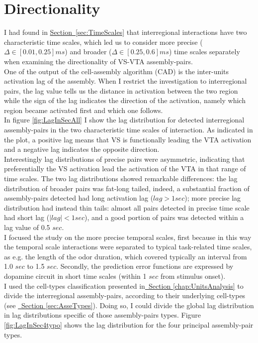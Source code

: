 \section{Directionality} 
\label{sec:Directionality}
 I had found in \hyperref[sec:TimeScales]{Section~\ref*{sec:TimeScales}} that interregional interactions have two characteristic time scales, which led us to consider more precise ($\Delta \in [0.01,0.25] ms$) and broader ($\Delta \in [0.25,0.6] ms$) time scales separately when examining the directionality of VS-VTA assembly-pairs.\\One of the output of the cell-assembly algorithm (CAD) is the inter-units activation lag of the assembly. When I restrict the investigation to interregional pairs, the lag value tells us the distance in activation between the two region while the sign of the lag indicates the direction of the activation, namely which region became activated first and which one follows.\\In figure \ref{fig:LagInSecAll} I show the lag distribution for detected interregional assembly-pairs in the two characteristic time scales of interaction. As indicated in the plot, a positive lag means that VS is functionally leading the VTA activation and a negative lag indicates the opposite direction.\\Interestingly lag distributions of precise pairs were asymmetric, indicating that preferentially the VS activation lead the activation of the VTA in that range of time scales. The two lag distributions showed remarkable differences: the lag distribution of broader pairs was fat-long tailed, indeed, a substantial fraction of assembly-pairs detected had long activation lag ($lag > 1 sec$); more precise lag distribution had instead thin tails: almost all pairs detected in precise time scale had short lag ($|lag| < 1 sec$), and a good portion of pairs was detected within a lag value of 0.5 $sec$.\\
 I focused the study on the more precise temporal scales, first because in this way the temporal scale interactions were separated to typical task-related time scales, as e.g. the length of the odor duration, which covered typically an interval from 1.0 $sec$ to 1.5 $sec$. Secondly, the prediction error functions are expressed by dopamine circuit in short time scales (within 1 $sec$ from stimulus onset).\\ I used the cell-types classification presented in\hyperref[chap:UnitsAnalysis]{~Section \ref*{chap:UnitsAnalysis}} to divide the interregional assembly-pairs, according to their underlying cell-types (see \hyperref[sec:AsseTypes]{~Section \ref*{sec:AsseTypes}}). Doing so, I could divide the global lag distribution in lag distributions specific of those assembly-pairs types. Figure \ref{fig:LagInSec4typo} shows the lag distribution for the four principal assembly-pair types.\\
